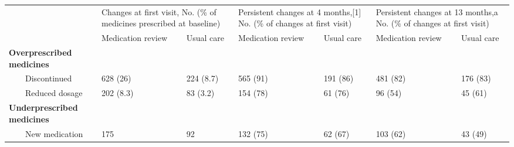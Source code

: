 \begin{table}[]
\begin{tabular}{lllllll}
\hline
\multirow{2}{*}{}                  & \multicolumn{2}{l}{Changes at first visit, No. (\%   of medicines prescribed at baseline)} & \multicolumn{2}{l}{Persistent changes at 4   months,{[}1{]} No. (\% of changes at first visit)} & \multicolumn{2}{l}{Persistent changes at 13   months,a No. (\% of   changes at first visit)} \\ \cline{2-7} 
                                   & Medication review                               & Usual care                               & Medication review                                  & Usual care                                 & Medication review                                & Usual care                                \\ \cline{1-1}
\textbf{Overprescribed medicines}  &                                                 &                                          &                                                    &                                            &                                                  &                                           \\
~~~~Discontinued           & 628 (26)                                        & 224 (8.7)                                & 565 (91)                                           & 191 (86)                                   & 481 (82)                                         & 176 (83)                                  \\
~~~~Reduced dosage         & 202 (8.3)                                       & 83 (3.2)                                 & 154 (78)                                           & 61 (76)                                    & 96 (54)                                          & 45 (61)                                   \\
\textbf{Underprescribed medicines} &                                                 &                                          &                                                    &                                            &                                                  &                                           \\
~~~~New medication         & 175                                             & 92                                       & 132 (75)                                           & 62 (67)                                    & 103 (62)                                         & 43 (49)                                   \\

\end{tabular}
\end{table}
